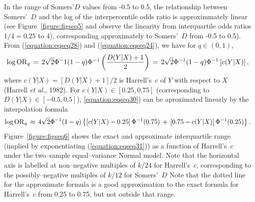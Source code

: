 \documentclass[a4paper,notitlepage]{article}      %
\begin{document}
In the range of Somers'$D$ values from -0.5 to 0.5,
the relationship between Somers'~$D$ and the log of the interpercentile odds ratio
is approximmately linear
(see Figure~\ref{figure:figseq5} and observe the linearity from interquartile odds ratios $1/4=0.25$ to 4),
corresponding approximately to Somers'~$D$ from -0.5 to 0.5).
From (\ref{equation:eqseq28}) and (\ref{equation:eqseq24}), we have for $q\in(0,1)$,
\begin{equation}
\log {\rm OR}_q \, = \, 2\sqrt{2}\Phi^-1(1-q) \Phi^{-1} \left(  {{D(Y|X)+1}\over 2} \right)
\, = \, 2\sqrt{2} \Phi^{-1}(1-q) \Phi^{-1} \left[ c(Y|X) \right],
\label{equation:eqseq30}
\end{equation}
where $c(Y|X)=[D(Y|X)+1]/2$ is Harrell's~$c$ of $Y$ with respect to $X$
(Harrell {\it et al.}, 1982)\cite{harrell1982}.
For $c(Y|X) \in [0.25, 0.75]$ (corresponding to $D(Y|X) \in [-0.5,0.5]$),
\ref{equation:eqseq30}) can be aproximated linearly by the interpolation formula
\begin{equation}
\log {\rm OR}_q \, \approx \,
4 \sqrt{2} \Phi^{-1}(1-q) \left\{ \left[ c(Y|X) - 0.25 \right] \Phi^{-1}(0.75) \, + \, \left[ 0.75 - c(Y|X) \right] \Phi^{-1}(0.25)  \right\} .
\label{equation:eqseq31}
\end{equation}
Figure~\ref{figure:figseq6} shows the exact and approximate interquartile range
(implied by exponentiating (\ref{equation:eqseq31}))
as a function of Harrell's~$c$ under the two--sample equal--variance Normal model.
Note that the horizontal axis is labelled at non--negative multiples of $k/24$ for Harrell's~$c$,
corresponding to the possibly--negative multiples of $k/12$ for Somers'~$D$
Note that the dotted line for the approximate formula
is a good approximation to the exact formula for Harrell's~$c$ from 0.25 to 0.75,
but not outside that range.
\end{document}
